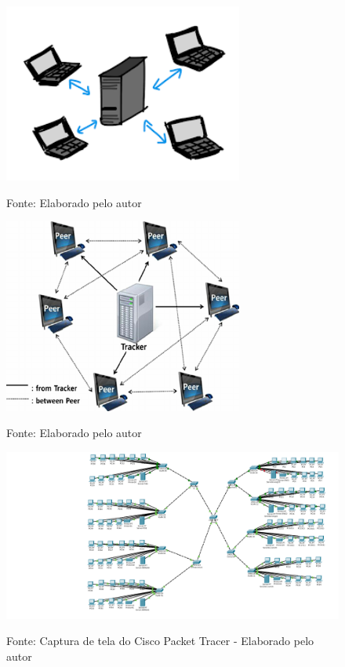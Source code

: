 \begin{figure}[H]
\centering
{}
\includegraphics[width=0.7\textwidth]{figure/cliente-server.png}

\label{fig:cliente_servidor}
{\fontsize{10pt}{\baselineskip}\selectfont
Fonte: Elaborado pelo autor}
\end{figure}

\begin{figure}[H]
\centering
{}
\includegraphics[width=0.7\textwidth]{figure/peer-to-peer.png}

\label{fig:peer_to_peer}
{\fontsize{10pt}{\baselineskip}\selectfont
Fonte: Elaborado pelo autor}
\end{figure}

\begin{figure}[H]
\centering
{}
\includegraphics[width=1\textwidth]{figure/rede-estrela.png}

\label{fig:topologia_supertech}
{\fontsize{10pt}{\baselineskip}\selectfont
Fonte: Captura de tela do Cisco Packet Tracer - Elaborado pelo autor}
\end{figure}

